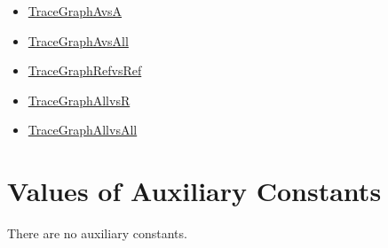 \documentclass[12pt]{article}
\begin{document}
\begin{itemize}
\item{\hyperref{../../TraceyGraph/avsa.svg}{}{}{TraceGraphAvsA}}
\item{\hyperref{../../TraceyGraph/avsall.svg}{}{}{TraceGraphAvsAll}}
\item{\hyperref{../../TraceyGraph/refvsref.svg}{}{}{TraceGraphRefvsRef}}
\item{\hyperref{../../TraceyGraph/allvsr.svg}{}{}{TraceGraphAllvsR}}
\item{\hyperref{../../TraceyGraph/allvsall.svg}{}{}{TraceGraphAllvsAll}}
\end{itemize}
\section{Values of Auxiliary Constants}
\label{Sec:AuxConstants}
There are no auxiliary constants.
\end{document}
